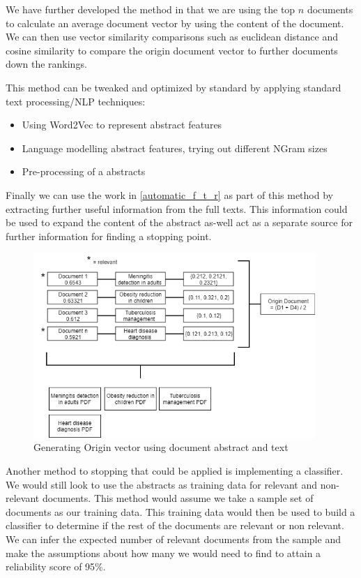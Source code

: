 We have further developed the method in that we are using the top $n$ documents to calculate an average document vector by using the content of the document. We can then use vector similarity comparisons such as euclidean distance and cosine similarity to compare the origin document vector to further documents down the rankings.

This method can be tweaked and optimized by standard by applying standard text processing/NLP techniques:

\begin{itemize}
  \item Using Word2Vec to represent abstract features
  \item Language modelling abstract features, trying out different NGram sizes
  \item Pre-processing of a abstracts
  
\end{itemize}

Finally we can use the work in \ref{automatic_f_t_r} as part of this method by extracting further useful information from the full texts. This information could be used to expand the content of the abstract as-well act as a separate source for further information for finding a stopping point.


\begin{figure}[H]
\center
\includegraphics[height=7cm]{figures/origin3.png}
\caption{Generating Origin vector using document abstract and text}
\end{figure}


Another method to stopping that could be applied is implementing a classifier. We would still look to use the abstracts as training data for relevant and non-relevant documents. This method would assume we take a sample set of documents as our training data. This training data would then be used to build a classifier to determine if the rest of the documents are relevant or non relevant. We can infer the expected number of relevant documents from the sample and make the assumptions about how many we would need to find to attain a reliability score of 95\%.



